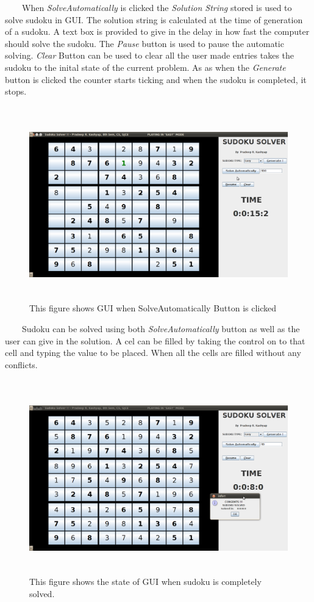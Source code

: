 \documentclass[12pt,a4paper]{article}
\begin{document}
\ \ \ \ When \textit{SolveAutomatically} is clicked the \textit{Solution String} stored is used to solve sudoku in GUI. The solution string is calculated at the time of generation of a sudoku. A text box is provided to give in the delay in how fast the computer should solve the sudoku. The \textit{Pause} button is used to pause the automatic solving. \textit{Clear} Button can be used to clear all the user made entries takes the sudoku to the inital state of the current problem. As as when the \textit{Generate} button is clicked the counter starts ticking and when the sudoku is completed, it stops.
\begin{figure}[H]
\begin{center}
\ \newline
\includegraphics[height=75mm, width=150mm]{solveautomatically.png}
\caption{This figure shows GUI when SolveAutomatically Button is clicked }
\end{center}
\end{figure}

\ \ \ \ Sudoku can be solved using both \textit{SolveAutomatically} button as well as the user can give in the solution. A cel can be filled by taking the control on to that cell and typing the value to be placed. When all the cells are filled without any conflicts.
\begin{figure}[H]
\begin{center}
\ \newline
\includegraphics[height=75mm, width=150mm]{completed.png}
\caption{This figure shows the state of GUI when sudoku is completely solved.}
\end{center}
\end{figure}
\newpage
\end{document}
